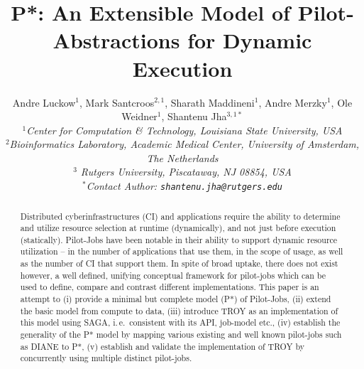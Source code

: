 \documentclass[conference,final]{IEEEtran}
\title{P*: An Extensible Model of Pilot-Abstractions for Dynamic Execution}
\date{}
\newcommand{\up}{\vspace*{-1em}}
\newcommand{\upp}{\vspace*{-0.5em}}
\begin{document}
\ifpdf
{}
\else
{}
\fi

\author{
  Andre Luckow$^{1}$, Mark Santcroos$^{2,1}$, Sharath Maddineni$^{1}$, Andre Merzky$^{1}$, Ole Weidner$^{1}$, Shantenu Jha$^{3,1*}$\\
  \small{\emph{$^{1}$Center for Computation \& Technology, Louisiana State University, USA}}\\
 \small{\emph{$^{2}$Bioinformatics Laboratory, Academic Medical Center, University of Amsterdam, The Netherlands}}\\
 \small{\emph{$^{3}$ Rutgers University, Piscataway, NJ 08854, USA}}\\
  \small{\emph{$^{*}$Contact Author: \texttt{shantenu.jha@rutgers.edu}}}\\
  \up\up\up\up }

\maketitle

\begin{abstract}
  \up
  Distributed cyberinfrastructures (CI) and applications require the
  ability to determine and utilize resource selection at runtime (dynamically),
  and not just before execution (statically).
  Pilot-Jobs have been notable in their ability to support dynamic
  resource utilization -- in the number of applications that use them,
  in the scope of usage, as well as the number of CI that support
  them.  In spite of broad uptake, there does not exist however, a
  well defined, unifying conceptual framework for pilot-jobs which can
  be used to define, compare and contrast different
  implementations. This paper is an attempt to (i) provide a minimal
  but complete model (P*) of Pilot-Jobs, (ii) extend the basic model
  from compute to data, (iii) introduce TROY as an implementation
  of this model using SAGA, i.\,e.\ consistent with its API, job-model
  etc., (iv) establish the generality of the P* model by mapping
  various existing and well known pilot-jobs such as DIANE to P*, (v)
  establish and validate the implementation of TROY by
  concurrently using multiple distinct pilot-jobs.\upp\upp\upp\upp
\end{abstract}
\end{document}
